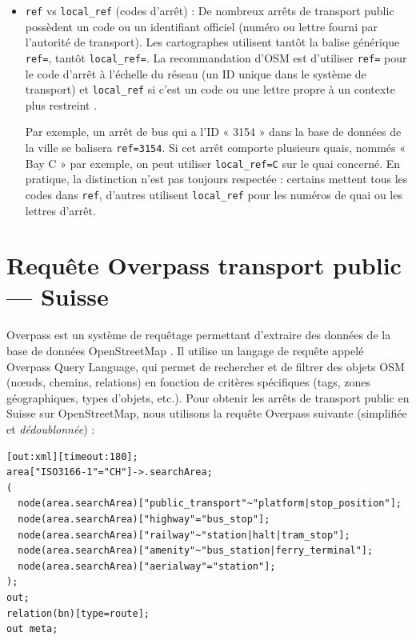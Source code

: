 \begin{itemize}
    \item \texttt{ref} vs \verb|local_ref| (codes d'arrêt) : De nombreux arrêts de transport public possèdent un code ou un identifiant officiel (numéro ou lettre fourni par l'autorité de transport). Les cartographes utilisent tantôt la balise générique \texttt{ref=}, tantôt \verb|local_ref=|. La recommandation d'OSM est d'utiliser \texttt{ref=} pour le code d'arrêt à l'échelle du réseau (un ID unique dans le système de transport) et \verb|local_ref| si c'est un code ou une lettre propre à un contexte plus restreint .
    
    Par exemple, un arrêt de bus qui a l'ID « 3154 » dans la base de données de la ville se balisera \texttt{ref=3154}. Si cet arrêt comporte plusieurs quais, nommés « Bay C » par exemple, on peut utiliser \verb|local_ref=C| sur le quai concerné. En pratique, la distinction n'est pas toujours respectée : certains mettent tous les codes dans \texttt{ref}, d'autres utilisent \verb|local_ref| pour les numéros de quai ou les lettres d'arrêt.
\end{itemize}

\section{Requête Overpass transport public — Suisse}
Overpass est un système de requêtage permettant d'extraire des données de la base de données OpenStreetMap . Il utilise un langage de requête appelé Overpass Query Language, qui permet de rechercher et de filtrer des objets OSM (nœuds, chemins, relations) en fonction de critères spécifiques (tags, zones géographiques, types d'objets, etc.).
Pour obtenir les arrêts de transport public en Suisse sur OpenStreetMap, nous utilisons la requête Overpass suivante (simplifiée et \textit{dédoublonnée}) :

\begin{tcolorbox}[colback=gray!10, colframe=brown, title=Requête Overpass]
\begin{verbatim}
[out:xml][timeout:180];
area["ISO3166-1"="CH"]->.searchArea;
(
  node(area.searchArea)["public_transport"~"platform|stop_position"];
  node(area.searchArea)["highway"="bus_stop"];
  node(area.searchArea)["railway"~"station|halt|tram_stop"];
  node(area.searchArea)["amenity"~"bus_station|ferry_terminal"];
  node(area.searchArea)["aerialway"="station"];
);
out;
relation(bn)[type=route];
out meta;
\end{verbatim}
\end{tcolorbox}

